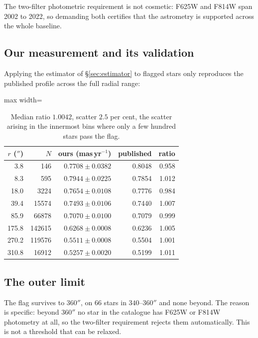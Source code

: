 \documentclass[11pt,a4paper]{article}
\newcommand{\masyr}{mas\,yr$^{-1}$}
\begin{document}
The two-filter photometric requirement is not cosmetic: F625W and F814W span 2002 to 2022, so
demanding both certifies that the astrometry is supported across the whole baseline.

\subsection{Our measurement and its validation}

Applying the estimator of \S\ref{sec:estimator} to flagged stars only reproduces the
published profile across the full radial range:

\begin{table}[h]
\centering\small
\begin{adjustbox}{max width=\linewidth}
\begin{tabular}{rrrrr}
\toprule
$r$ ($''$) & $N$ & ours (\masyr) & published & ratio \\
\midrule
3.8 & 146 & $0.7708\pm0.0382$ & 0.8048 & 0.958 \\
8.3 & 595 & $0.7944\pm0.0225$ & 0.7854 & 1.012 \\
18.0 & 3224 & $0.7654\pm0.0108$ & 0.7776 & 0.984 \\
39.4 & 15574 & $0.7493\pm0.0106$ & 0.7440 & 1.007 \\
85.9 & 66878 & $0.7070\pm0.0100$ & 0.7079 & 0.999 \\
175.8 & 142615 & $0.6268\pm0.0008$ & 0.6236 & 1.005 \\
270.2 & 119576 & $0.5511\pm0.0008$ & 0.5504 & 1.001 \\
310.8 & 16912 & $0.5257\pm0.0020$ & 0.5199 & 1.011 \\
\bottomrule
\end{tabular}
\end{adjustbox}
\caption{Median ratio $1.0042$, scatter $2.5$ per cent, the scatter arising in the innermost
bins where only a few hundred stars pass the flag.}
\end{table}

\subsection{The outer limit}

The flag survives to $360''$, on 66 stars in $340$--$360''$ and none beyond. The reason is
specific: beyond $360''$ no star in the catalogue has F625W or F814W photometry at all, so
the two-filter requirement rejects them automatically. This is not a threshold that can be
relaxed.
\end{document}

